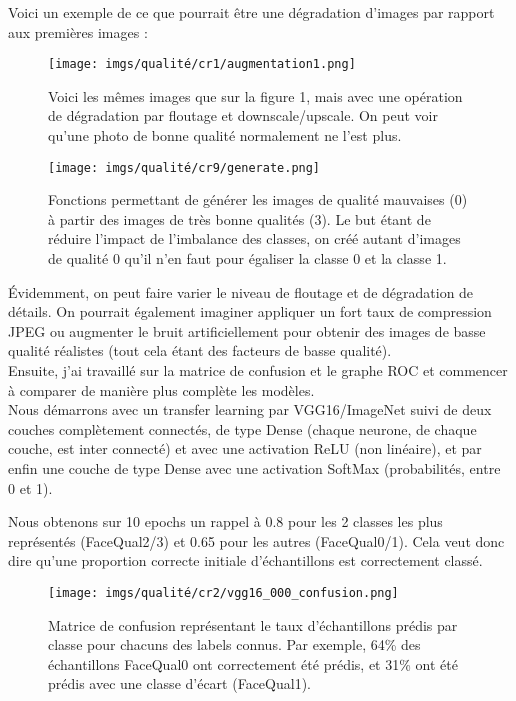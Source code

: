 Voici un exemple de ce que pourrait être une dégradation d'images par rapport aux premières images :

\begin{figure}
    \centering
    \texttt{[image: imgs/qualité/cr1/augmentation1.png]}
    \caption[Images dégradées]{Voici les mêmes images que sur la figure 1, mais avec une opération de dégradation par floutage et downscale/upscale. On peut voir qu'une photo de bonne qualité normalement ne l'est plus.}
    \label{fig:my_label}
\end{figure}

\begin{figure}
    \centering
    \texttt{[image: imgs/qualité/cr9/generate.png]}
    \caption[Code pour dégrader les images]{Fonctions permettant de générer les images de qualité mauvaises (0) à partir des images de très bonne qualités (3). Le but étant de réduire l'impact de l'imbalance des classes, on créé autant d'images de qualité 0 qu'il n'en faut pour égaliser la classe 0 et la classe 1.}
    \label{fig:my_label}
\end{figure}

Évidemment, on peut faire varier le niveau de floutage et de dégradation de détails. On pourrait également imaginer appliquer un fort taux de compression JPEG ou augmenter le bruit artificiellement pour obtenir des images de basse qualité réalistes (tout cela étant des facteurs de basse qualité).\\

Ensuite, j'ai travaillé sur la \gls{matrice de confusion} et le \gls{graphe ROC} et commencer à comparer de manière plus complète les modèles.\\

Nous démarrons avec un \gls{transfer learning} par VGG16/ImageNet suivi de deux couches complètement connectés, de type Dense (chaque neurone, de chaque couche, est inter connecté) et avec une activation \gls{ReLU} (non linéaire), et par enfin une couche de type Dense avec une activation SoftMax (probabilités, entre 0 et 1).

Nous obtenons sur 10 epochs un rappel à 0.8 pour les 2 classes les plus représentés (FaceQual2/3) et 0.65 pour les autres (FaceQual0/1). Cela veut donc dire qu'une proportion correcte initiale d'échantillons est correctement classé.

\begin{figure}
    \centering
    \texttt{[image: imgs/qualité/cr2/vgg16\_000\_confusion.png]}
    \caption[Matrice de confusion pour une 1re classification]{\Gls{Matrice de confusion} représentant le taux d'échantillons prédis par classe pour chacuns des labels connus. Par exemple, 64\% des échantillons FaceQual0 ont correctement été prédis, et 31\% ont été prédis avec une classe d'écart (FaceQual1).}
    \label{fig:my_label}
\end{figure}

